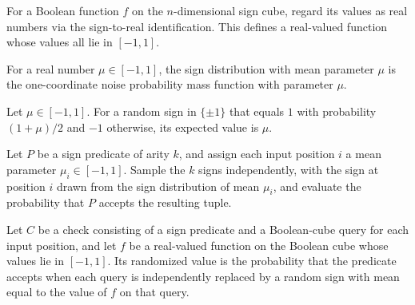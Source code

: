 \begin{definition}
\label{FABL.BoundedCubeFunction.ofBoolean}
\leanok
{}
For a Boolean function $f$ on the $n$-dimensional sign cube, regard its values as real
numbers via the sign-to-real identification. This defines a real-valued function whose
values all lie in $[-1,1]$.
\end{definition}

\begin{definition}
\label{FABL.signPMFOfMean}
\leanok
{}
For a real number $\mu\in[-1,1]$, the sign distribution with mean parameter $\mu$ is the
one-coordinate noise probability mass function with parameter $\mu$.
\end{definition}

\begin{theorem}
\label{FABL.pmfExpectation_signPMFOfMean}
\leanok
{}
Let $\mu\in[-1,1]$. For a random sign in $\{\pm1\}$ that equals $1$ with probability
$(1+\mu)/2$ and $-1$ otherwise, its expected value is $\mu$.
\end{theorem}

\begin{definition}
\label{FABL.SignPredicate.randomizedValue}
\leanok
{}
Let $P$ be a sign predicate of arity $k$, and assign each input position $i$ a mean
parameter $\mu_i\in[-1,1]$. Sample the $k$ signs independently, with the sign at
position $i$ drawn from the sign distribution of mean $\mu_i$, and evaluate the
probability that $P$ accepts the resulting tuple.
\end{definition}

\begin{definition}
\label{FABL.SignQueryCheck.randomizedValue}
\leanok
{}
Let $C$ be a check consisting of a sign predicate and a Boolean-cube query for each
input position, and let $f$ be a real-valued function on the Boolean cube whose values
lie in $[-1,1]$. Its randomized value is the probability that the predicate accepts when
each query is independently replaced by a random sign with mean equal to the value of
$f$ on that query.
\end{definition}


